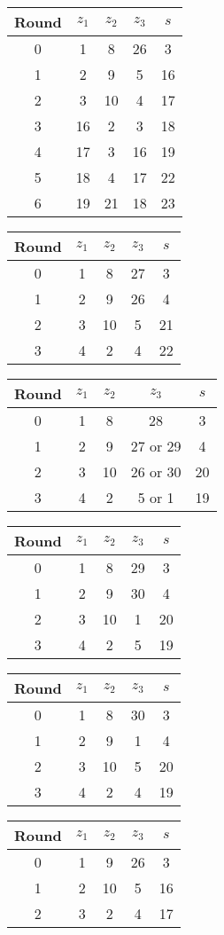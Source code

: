 \begin{multicols}{2}
\begin{tabular}{c | c | c | c | c }
Round & $z_1$ & $z_2$ & $z_3$ & $s$ \\
\hline
0 & 1 & 8 & 26 & 3  \\
1 & 2 & 9 & 5 & 16 \\
2 & 3 & 10 & 4 & 17 \\
3 & 16 & 2 & 3 & 18 \\
4 & 17 & 3 & 16 & 19 \\
5 & 18 & 4 & 17 & 22 \\
6 & 19 & 21 & 18 & 23
\end{tabular}


\begin{tabular}{c | c | c | c | c }
Round & $z_1$ & $z_2$ & $z_3$ & $s$ \\
\hline
0 & 1 & 8 & 27 & 3 \\
1 & 2 & 9 & 26 & 4 \\
2 & 3 & 10 & 5 & 21 \\
3 & 4 & 2 & 4 & 22
\end{tabular}


\begin{tabular}{c | c | c | c | c }
Round & $z_1$ & $z_2$ & $z_3$ & $s$ \\
\hline
0 & 1 & 8 & 28 & 3 \\
1 & 2 & 9 & 27 or 29 & 4 \\
2 & 3 & 10 & 26 or 30 & 20 \\
3 & 4 & 2 & 5 or 1 & 19
\end{tabular}


\begin{tabular}{c | c | c | c | c }
Round & $z_1$ & $z_2$ & $z_3$ & $s$ \\
\hline
0 & 1 & 8 & 29 & 3 \\
1 & 2 & 9 & 30 & 4 \\
2 & 3 & 10 & 1 & 20 \\
3 & 4 & 2 & 5 & 19
\end{tabular}


\begin{tabular}{c | c | c | c | c }
Round & $z_1$ & $z_2$ & $z_3$ & $s$ \\
\hline
0 & 1 & 8 & 30 & 3 \\
1 & 2 & 9 & 1 & 4 \\
2 & 3 & 10 & 5 & 20 \\
3 & 4 & 2 & 4 & 19
\end{tabular}


\begin{tabular}{c | c | c | c | c }
Round & $z_1$ & $z_2$ & $z_3$ & $s$ \\
\hline
0 & 1 & 9 & 26 & 3 \\
1 & 2 & 10 & 5 & 16 \\
2 & 3 & 2 & 4 & 17
\end{tabular}



\end{multicols}
